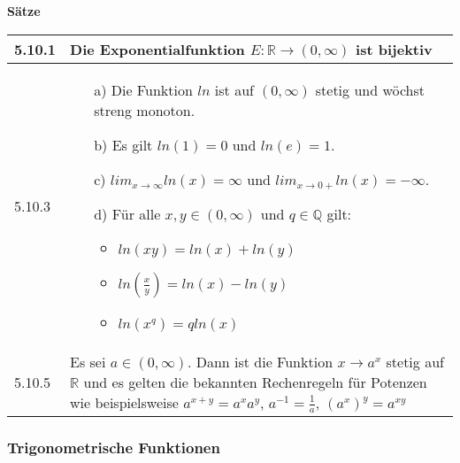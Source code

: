     \noindent 
    \textbf{Sätze}
    \begin{table}[H]
    \begin{tabularx}{\textwidth}{X m{16cm}}
        \toprule

        5.10.1& Die Exponentialfunktion $E: \mathbb{R} \rightarrow (0,\infty)$ ist \textbf{bijektiv} \\
        \midrule
        5.10.3& \begin{itemize}[topsep=-0.5cm]
                    \item[a)] Die Funktion $ln$ ist auf $(0, \infty)$ stetig und wöchst streng monoton.
                    \item[b)] Es gilt $ln(1) = 0$ und $ln(e) = 1$.
                    \item[c)] $lim_{x \rightarrow \infty} ln(x) = \infty$ und $lim_{x \rightarrow 0+} ln(x) = -\infty$.
                    \item[d)] Für alle $x, y \in (0, \infty)$ und $q \in \mathbb{Q}$ gilt:
                                \begin{itemize}[topsep=-0.5cm]
                                    \item $ln(xy) = ln(x) + ln(y)$
                                    \item $ln(\frac{x}{y}) = ln(x) - ln(y)$
                                    \item $ln(x^q) = q ln(x)$
                                \end{itemize} \vspace{-0cm} 
                \end{itemize} \vspace{-0cm} \\
        \midrule
        5.10.5& Es sei $a \in (0,\infty)$. Dann ist die Funktion $x \rightarrow a^x$ stetig auf $\mathbb{R}$ und es gelten die bekannten
                Rechenregeln für Potenzen wie beispielsweise $a^{x+y}=a^xa^y$, $a^{-1}=\frac{1}{a}$, $(a^x)^y=a^{xy}$ \\

        \bottomrule
    \end{tabularx}
    \end{table}

\subsubsection{Trigonometrische Funktionen}

